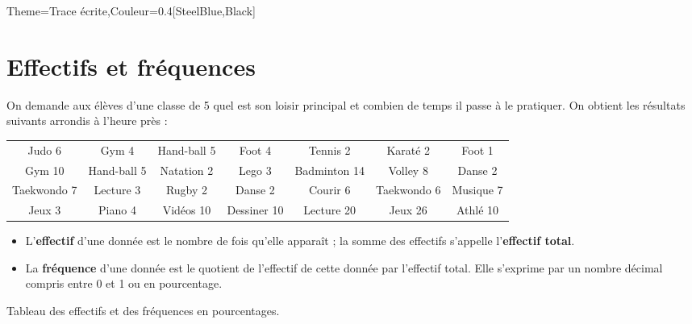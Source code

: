 \begin{Maquette}[Cours]{Theme={Trace écrite},Couleur={0.4[SteelBlue,Black]}}

   \section{Effectifs et fréquences}

      On demande aux élèves d'une classe de 5 quel est son loisir principal et combien de temps il passe à le pratiquer. On obtient les résultats suivants arrondis à l'heure près :
      \begin{center}
         {\small
         \begin{tabular}{|*{7}{c|}}
            \hline
            Judo \hfill 6 & Gym \hfill 4 & Hand-ball \hfill 5 & Foot \hfill 4 & Tennis \hfill 2 & Karaté \hfill 2 & Foot \hfill 1 \\
            Gym \hfill 10 & Hand-ball \hfill 5 & Natation \hfill 2 & Lego \hfill 3 & Badminton \hfill 14 & Volley \hfill 8 & Danse \hfill 2 \\
            Taekwondo \hfill 7 & Lecture \hfill 3 & Rugby \hfill 2 & Danse \hfill 2 & Courir \hfill 6 & Taekwondo \hfill 6 & Musique \hfill 7 \\
            Jeux \hfill 3 & Piano \hfill 4 & Vidéos \hfill 10 & Dessiner \hfill 10 & Lecture \hfill 20 & Jeux \hfill 26 & Athlé \hfill 10\\
            \hline
         \end{tabular}}
      \end{center}

      \begin{definition*}{}
         \begin{itemize}
            \item L'{\bf effectif} d'une donnée est le nombre de fois qu'elle apparaît ; la somme des effectifs s'appelle l'{\bf effectif total}.
            \item La {\bf fréquence} d'une donnée est le quotient de l'effectif de cette donnée par l'effectif total. Elle s'exprime par un nombre décimal compris entre 0 et 1 ou en pourcentage.
         \end{itemize}
      \end{definition*}
      
      \begin{exemple*}{}
         Tableau des effectifs et des fréquences en pourcentages. \par
            {\small 
             }
      \end{exemple*}


\end{Maquette}
